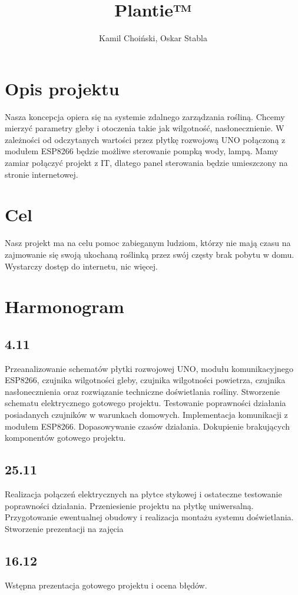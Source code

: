 \documentclass{article}
\begin{document}
\title{Plantie™}
\author{Kamil Choiński, Oskar Stabla}
\maketitle

\section{Opis projektu}
Nasza koncepcja opiera się na systemie zdalnego zarządzania rośliną.
Chcemy mierzyć parametry gleby i otoczenia takie jak wilgotność, nasłonecznienie.
W zależności od odczytanych wartości przez płytkę rozwojową UNO połączoną z modułem ESP8266 będzie możliwe sterowanie pompką wody, lampą.
Mamy zamiar połączyć projekt z IT, dlatego panel sterowania będzie umieszczony na stronie internetowej.
\section{Cel}
Nasz projekt ma na celu pomoc zabieganym ludziom, którzy nie mają czasu na zajmowanie się swoją ukochaną roślinką przez swój częsty brak pobytu w domu. Wystarczy dostęp do internetu, nic więcej.
\section{Harmonogram}
\subsection{4.11}
Przeanalizowanie schematów płytki rozwojowej UNO, modułu komunikacyjnego ESP8266, czujnika wilgotności gleby, czujnika wilgotności powietrza, czujnika nasłonecznienia oraz rozwiązanie techniczne doświetlania rośliny. Stworzenie schematu elektrycznego gotowego projektu. Testowanie poprawności działania posiadanych czujników w warunkach domowych. Implementacja komunikacji z modułem ESP8266. Dopasowywanie czasów działania. 
Dokupienie brakujących komponentów gotowego projektu. 
\subsection{25.11}
Realizacja połączeń elektrycznych na płytce stykowej i ostateczne testowanie poprawności działania. Przeniesienie projektu na płytkę uniwersalną. Przygotowanie ewentualnej obudowy i realizacja montażu systemu doświetlania. Stworzenie prezentacji na zajęcia
\subsection{16.12}
Wstępna prezentacja gotowego projektu i ocena błędów.
\end{document}
